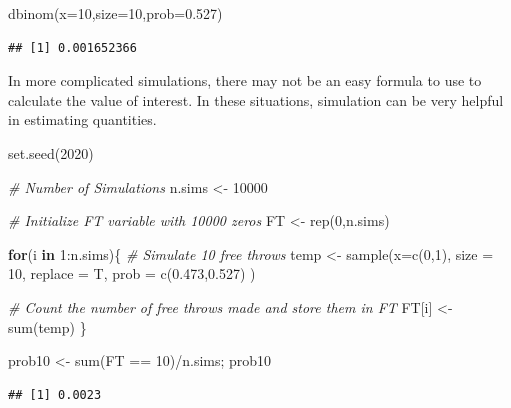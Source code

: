 \documentclass[
  11pt,
]{book}
\newenvironment{Shaded}{\begin{snugshade}}{\end{snugshade}}
\newcommand{\AttributeTok}[1]{\textcolor[rgb]{0.77,0.63,0.00}{#1}}
\newcommand{\CommentTok}[1]{\textcolor[rgb]{0.56,0.35,0.01}{\textit{#1}}}
\newcommand{\ControlFlowTok}[1]{\textcolor[rgb]{0.13,0.29,0.53}{\textbf{#1}}}
\newcommand{\DecValTok}[1]{\textcolor[rgb]{0.00,0.00,0.81}{#1}}
\newcommand{\FloatTok}[1]{\textcolor[rgb]{0.00,0.00,0.81}{#1}}
\newcommand{\FunctionTok}[1]{\textcolor[rgb]{0.00,0.00,0.00}{#1}}
\newcommand{\NormalTok}[1]{#1}
\newcommand{\OtherTok}[1]{\textcolor[rgb]{0.56,0.35,0.01}{#1}}
\newcommand{\SpecialCharTok}[1]{\textcolor[rgb]{0.00,0.00,0.00}{#1}}
\theoremstyle{definition}
\theoremstyle{definition}
\theoremstyle{definition}
\theoremstyle{definition}
\theoremstyle{remark}
\begin{document}
\begin{Shaded}
\begin{Highlighting}[]
\FunctionTok{dbinom}\NormalTok{(}\AttributeTok{x=}\DecValTok{10}\NormalTok{,}\AttributeTok{size=}\DecValTok{10}\NormalTok{,}\AttributeTok{prob=}\FloatTok{0.527}\NormalTok{)}
\end{Highlighting}
\end{Shaded}

\begin{verbatim}
## [1] 0.001652366
\end{verbatim}

In more complicated simulations, there may not be an easy formula to use to calculate the value of interest. In these situations, simulation can be very helpful in estimating quantities.

\begin{Shaded}
\begin{Highlighting}[]
\FunctionTok{set.seed}\NormalTok{(}\DecValTok{2020}\NormalTok{)}

\CommentTok{\# Number of Simulations}
\NormalTok{n.sims }\OtherTok{\textless{}{-}} \DecValTok{10000}

\CommentTok{\# Initialize FT variable with 10000 zeros}
\NormalTok{FT }\OtherTok{\textless{}{-}} \FunctionTok{rep}\NormalTok{(}\DecValTok{0}\NormalTok{,n.sims)}

\ControlFlowTok{for}\NormalTok{(i }\ControlFlowTok{in} \DecValTok{1}\SpecialCharTok{:}\NormalTok{n.sims)\{}
  \CommentTok{\# Simulate 10 free throws}
\NormalTok{  temp }\OtherTok{\textless{}{-}} \FunctionTok{sample}\NormalTok{(}\AttributeTok{x=}\FunctionTok{c}\NormalTok{(}\DecValTok{0}\NormalTok{,}\DecValTok{1}\NormalTok{), }\AttributeTok{size =} \DecValTok{10}\NormalTok{, }\AttributeTok{replace =}\NormalTok{ T, }\AttributeTok{prob =} \FunctionTok{c}\NormalTok{(}\FloatTok{0.473}\NormalTok{,}\FloatTok{0.527}\NormalTok{) )}
  
  \CommentTok{\# Count the number of free throws made and store them in FT}
\NormalTok{  FT[i] }\OtherTok{\textless{}{-}} \FunctionTok{sum}\NormalTok{(temp)}
\NormalTok{\}}

\NormalTok{prob10 }\OtherTok{\textless{}{-}} \FunctionTok{sum}\NormalTok{(FT }\SpecialCharTok{==} \DecValTok{10}\NormalTok{)}\SpecialCharTok{/}\NormalTok{n.sims; prob10}
\end{Highlighting}
\end{Shaded}

\begin{verbatim}
## [1] 0.0023
\end{verbatim}
\end{document}
